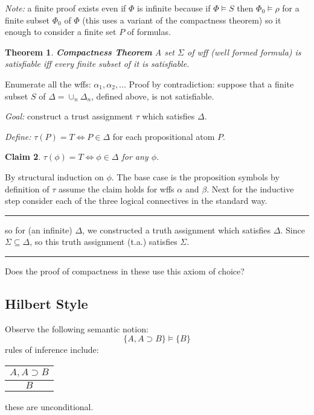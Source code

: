 \documentclass[twoside]{article}
\newcounter{lecnum}
\newtheorem{theorem}{Theorem}[lecnum]
\newtheorem{claim}[theorem]{Claim}
\newenvironment{proof}{{\bf Proof:}}{\hfill\rule{2mm}{2mm}}
\begin{document}
\textit{Note:} a finite proof exists even if $\Phi$ is infinite because if $\Phi \vDash S$ then $\Phi_0 \vDash \rho$ for a finite subset $\Phi_0$ of $\Phi$ (this uses a variant of the compactness theorem) so it enough to consider a finite set $P$ of formulas.

\begin{theorem}
\textbf{Compactness Theorem} A set $\Sigma$ of wff (well formed formula) is satisfiable iff every finite subset of it is satisfiable. 
\end{theorem}
\begin{proof}	
Enumerate all the wffs: $\alpha_1, \alpha_2, ...$ 
Proof by contradiction: suppose that a finite subset $S$ of $\Delta = \cup_{n} \Delta_n$, defined above, is not satisfiable.  

\textit{Goal:} construct a trust assignment $\tau$ which satisfies $\Delta$.

\textit{Define:} $\tau(P) = T \iff P \in \Delta$ for each propositional atom $P$.

\begin{claim}
$\tau(\phi) = T \iff \phi \in \Delta$ for any $\phi$.
\end{claim}
\begin{proof}
By structural induction on $\phi$. The base case is the proposition symbols by definition of $\tau$  assume the claim holds for wffs $\alpha$ and $\beta$. Next for the inductive step consider each of the three logical connectives in the standard way.  
\end{proof}

so for (an infinite) $\Delta$, we constructed a truth assignment which satisfies $\Delta$. Since $\Sigma \subseteq \Delta$, so this truth assignment (t.a.) satisfies $\Sigma$. 

\end{proof}

Does the proof of compactness in these use this axiom of choice?

\subsection{Hilbert Style}
Observe the following semantic notion:
\[\{A, A \supset B\} \vDash \{B\}\]
rules of inference include:
\begin{tabular}{c}
$A, A \supset B$ \\
\hline
$B$ \\
\end{tabular}
these are unconditional.
\end{document}
